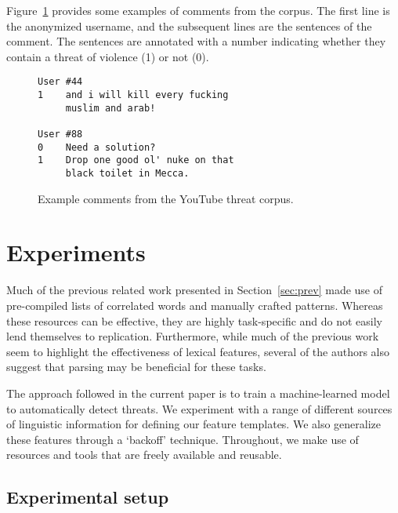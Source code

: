 \documentclass[11pt,letterpaper]{article}
\newcommand{\tov}{threat of violence}
\begin{document}
Figure~\ref{fig:comments} provides some examples of comments from the corpus. The first line is the anonymized username, and the subsequent lines are the sentences of the comment. %
The sentences are annotated with a number indicating whether they contain a \tov{} (1) or not (0).

\begin{figure}
\begin{Verbatim}[fontsize=\small]
User #44
1    and i will kill every fucking
     muslim and arab!

User #88
0    Need a solution?
1    Drop one good ol' nuke on that
     black toilet in Mecca.
\end{Verbatim}
\caption{Example comments from the YouTube threat corpus.}
\label{fig:comments}
\end{figure}

\section{Experiments}
\label{sec:exp}
Much of the previous related work presented in Section~\ref{sec:prev} made use of pre-compiled lists of correlated words and manually crafted patterns. Whereas these resources can be effective, they are highly task-specific and do not easily lend themselves to replication. Furthermore, while much of the previous work seem to highlight the effectiveness of lexical features, several of the authors also suggest that parsing may be beneficial for these tasks.

The approach followed in the current paper is to train a machine-learned model to automatically detect threats. We experiment with a range of different sources of linguistic information for defining our feature templates. 
We also generalize these features through a `backoff' technique. Throughout, we make use of resources and tools that are freely available and reusable.


\subsection{Experimental setup}
\end{document}
